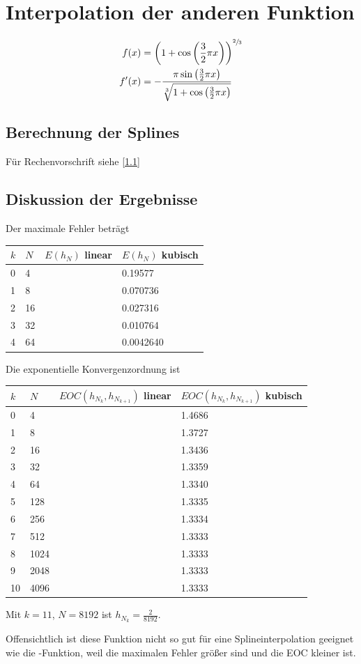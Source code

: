 \documentclass[ngerman,a4paper]{texmf/tex/latex/mathscript/mathscript}
\begin{document}
\section{Interpolation der anderen Funktion}
	\begin{align}
		f(x) &= \left( 1+\cos\left(\frac{3}{2}\pi x \right) \right)^{\sfrac{2}{3}}\notag \\
		f'(x) &=-\frac{\pi\sin\left(\frac{3}{2}\pi x\right)}{\sqrt[3]{1+\cos\left(\frac{3}{2}\pi x \right)}}\notag
	\end{align}
	
	\subsection{Berechnung der Splines}
	Für Rechenvorschrift siehe \ref{1.1}
	
	
	\subsection{Diskussion der Ergebnisse}
	
	Der maximale Fehler beträgt
	\begin{center}
		\begin{tabular}{ll|l|l}
			$k$ & $N$ & $E(h_N)$ linear & $E(h_N)$ kubisch \\
			\hline
			0 & 4 &   & 0.19577 \\
			\hline
			1 & 8 &  & 0.070736 \\
			\hline 
			2 & 16 &   & 0.027316 \\
			\hline 
			3 & 32 &   & 0.010764 \\
			\hline 
			4 & 64 &  & 0.0042640 \\
		\end{tabular}
	\end{center} 

	Die exponentielle Konvergenzordnung ist
	\begin{center}
		\begin{tabular}{ll|l|l}
			$k$ & $N$ & $EOC(h_{N_k},h_{N_{k+1}})$ linear & $EOC(h_{N_k},h_{N_{k+1}})$ kubisch \\
			\hline
			0 & 4 & &1.4686  \\
			\hline
			1 & 8 & & 1.3727\\
			\hline
			2 & 16 & & 1.3436 \\
			\hline
			3 & 32 & & 1.3359 \\
			\hline
			4 & 64 & & 1.3340 \\
			\hline
			5 & 128 & & 1.3335 \\
			\hline
			6 & 256 & & 1.3334 \\
			\hline
			7 & 512 & & 1.3333 \\
			\hline
			8 & 1024 & & 1.3333 \\
			\hline
			9 & 2048 & & 1.3333 \\
			\hline
			10 & 4096 & & 1.3333 \\
			\hline
		\end{tabular}
	\end{center}
	
	Mit $k=11$, $N=8192$ ist $h_{N_k}= \frac{2}{8192}$.
	
	Offensichtlich ist diese Funktion nicht so gut für eine Splineinterpolation geeignet wie die -Funktion, weil die maximalen Fehler größer sind und die EOC kleiner ist.
\end{document}
